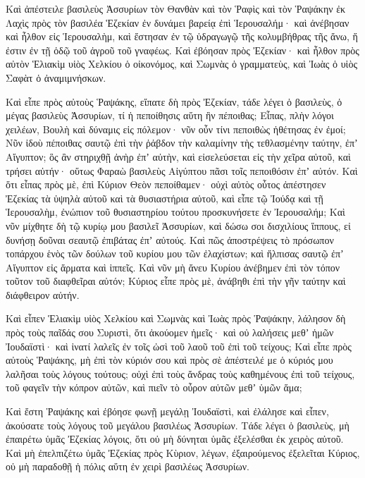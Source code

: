 {\par }{\PP {}Καὶ ἀπέστειλε βασιλεὺς Ἀσσυρίων τὸν Θανθὰν καὶ τὸν Ῥαφὶς καὶ τὸν Ῥαψάκην ἐκ Λαχὶς πρὸς τὸν βασιλέα Ἑζεκίαν ἐν δυνάμει βαρείᾳ ἐπὶ Ἱερουσαλήμ· καὶ ἀνέβησαν καὶ ἦλθον εἰς Ἱερουσαλὴμ, καὶ ἔστησαν ἐν τῷ ὑδραγωγῷ τῆς κολυμβήθρας τῆς ἄνω, ἥ ἐστιν ἐν τῇ ὁδῷ τοῦ ἀγροῦ τοῦ γναφέως.
Καὶ ἐβόησαν πρὸς Ἐζεκίαν· καὶ ἦλθον πρὸς αὐτὸν Ἑλιακὶμ υἱὸς Χελκίου ὁ οἰκονόμος, καὶ Σωμνὰς ὁ γραμματεὺς, καὶ Ἰωὰς ὁ υἱὸς Σαφὰτ ὁ ἀναμιμνήσκων.
\par }{\PP {}Καὶ εἶπε πρὸς αὐτοὺς Ῥαψάκης, εἴπατε δὴ πρὸς Ἐζεκίαν, τάδε λέγει ὁ βασιλεὺς, ὁ μέγας βασιλεὺς Ἀσσυρίων, τί ἡ πεποίθησις αὕτη ἣν πέποιθας;
Εἶπας, πλὴν λόγοι χειλέων, Βουλὴ καὶ δύναμις εἰς πόλεμον· νῦν οὖν τίνι πεποιθὼς ἠθέτησας ἐν ἐμοί;
Νῦν ἰδοὺ πέποιθας σαυτῷ ἐπὶ τὴν ῥἁβδον τὴν καλαμίνην τὴς τεθλασμένην ταύτην, ἐπʼ Αἴγυπτον; ὃς ἂν στηριχθῇ ἀνὴρ ἐπʼ αὐτὴν, καὶ εἰσελεύσεται εἰς τὴν χεῖρα αὐτοῦ, καὶ τρήσει αὐτήν· οὕτως Φαραὼ βασιλεὺς Αἰγύπτου πᾶσι τοῖς πεποιθόσιν ἐπʼ αὐτόν.
Καὶ ὅτι εἶπας πρὸς μὲ, ἐπὶ Κύριον Θεὸν πεποίθαμεν· οὐχὶ αὐτὸς οὗτος ἀπέστησεν Ἐζεκίας τὰ ὑψηλὰ αὐτοῦ καὶ τὰ θυσιαστήρια αὐτοῦ, καὶ εἶπε τῷ Ἰούδᾳ καὶ τῇ Ἱερουσαλὴμ, ἐνώπιον τοῦ θυσιαστηρίου τούτου προσκυνήσετε ἐν Ἰερουσαλήμ;
Καὶ νῦν μίχθητε δὴ τῷ κυρίῳ μου βασιλεῖ Ἀσσυρίων, καὶ δώσω σοι δισχιλίους ἵππους, εἰ δυνήσῃ δοῦναι σεαυτῷ ἐπιβάτας ἐπʼ αὐτούς.
Καὶ πῶς ἀποστρέψεις τὸ πρόσωπον τοπάρχου ἑνὸς τῶν δούλων τοῦ κυρίου μου τῶν ἐλαχίστων; καὶ ἤλπισας σαυτῷ ἐπʼ Αἴγυπτον εἰς ἅρματα καὶ ἱππεῖς.
Καὶ νῦν μὴ ἄνευ Κυρίου ἀνέβημεν ἐπὶ τὸν τόπον τοῦτον τοῦ διαφθεῖραι αὐτόν; Κύριος εἶπε πρὸς μὲ, ἀνάβηθι ἐπὶ τὴν γῆν ταύτην καὶ διάφθειρον αὐτήν.
\par }{\PP {}Καὶ εἶπεν Ἑλιακὶμ υἱὸς Χελκίου καὶ Σωμνὰς καὶ Ἰωὰς πρὸς Ῥαψάκην, λάλησον δὴ πρὸς τοὺς παῖδάς σου Συριστὶ, ὅτι ἀκούομεν ἡμεῖς· καὶ οὐ λαλήσεις μεθʼ ἡμῶν Ἰουδαϊστὶ· καὶ ἱνατί λαλεῖς ἐν τοῖς ὠσὶ τοῦ λαοῦ τοῦ ἐπὶ τοῦ τείχους;
Καὶ εἶπε πρὸς αὐτοὺς Ῥαψάκης, μὴ ἐπὶ τὸν κύριόν σου καὶ πρὸς σὲ ἀπέστειλέ με ὁ κύριός μου λαλῆσαι τοὺς λόγους τούτους; οὐχὶ ἐπὶ τοὺς ἄνδρας τοὺς καθημένους ἐπὶ τοῦ τείχους, τοῦ φαγεῖν τὴν κόπρον αὐτῶν, καὶ πιεῖν τὸ οὖρον αὐτῶν μεθʼ ὑμῶν ἅμα;
\par }{\PP {}Καὶ ἔστη Ῥαψάκης καὶ ἐβόησε φωνῇ μεγάλῃ Ἰουδαϊστὶ, καὶ ἐλάλησε καὶ εἶπεν, ἀκούσατε τοὺς λόγους τοῦ μεγάλου βασιλέως Ἀσσυρίων.
Τάδε λέγει ὁ βασιλεὺς, μὴ ἐπαιρέτω ὑμᾶς Ἐζεκίας λόγοις, ὅτι οὐ μὴ δύνηται ὑμᾶς ἐξελέσθαι ἐκ χειρὸς αὐτοῦ.
Καὶ μὴ ἐπελπιζέτω ὑμᾶς Ἐζεκίας πρὸς Κὺριον, λέγων, ἐξαιρούμενος ἐξελεῖται Κύριος, οὐ μὴ παραδοθῇ ἡ πόλις αὕτη ἐν χειρὶ βασιλέως Ἀσσυρίων.
}
